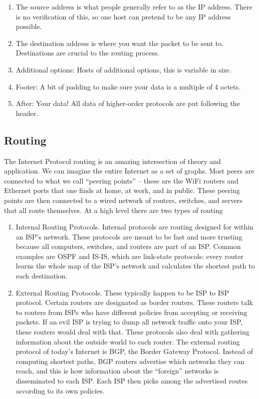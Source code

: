 \begin{enumerate}
  \item The source address is what people generally refer to as the IP address.
    There is no verification of this, so one host can pretend to be any IP address possible.
  \item The destination address is where you want the packet to be sent to.
    Destinations are crucial to the routing process.
  \item Additional options: Hosts of additional options, this is variable in size.
  \item Footer: A bit of padding to make sure your data is a multiple of 4 octets.
  \item After: Your data! All data of higher-order protocols are put following the header.
\end{enumerate}

\subsection{Routing}

The Internet Protocol routing is an amazing intersection of theory and application.
We can imagine the entire Internet as a set of graphs.
Most peers are connected to what we call ``peering points'' -- these are the WiFi routers and Ethernet ports that one finds at home, at work, and in public.
These peering points are then connected to a wired network of routers, switches, and servers that all route themselves.
At a high level there are two types of routing

\begin{enumerate}
\item Internal Routing Protocols.
  Internal protocols are routing designed for within an ISP's network.
  These protocols are meant to be fast and more trusting because all computers, switches, and routers are part of an ISP.
  Common examples are OSPF and IS-IS, which are link-state protocols: every router learns the whole map of the ISP's network and calculates the shortest path to each destination.
\item External Routing Protocols.
  These typically happen to be ISP to ISP protocol.
  Certain routers are designated as border routers.
  These routers talk to routers from ISPs who have different policies from accepting or receiving packets.
  If an evil ISP is trying to dump all network traffic onto your ISP, these routers would deal with that.
  These protocols also deal with gathering information about the outside world to each router.
  The external routing protocol of today's Internet is BGP, the Border Gateway Protocol.
  Instead of computing shortest paths, BGP routers advertise which networks they can reach, and this is how information about the ``foreign'' networks is disseminated to each ISP.
  Each ISP then picks among the advertised routes according to its own policies.
\end{enumerate}

